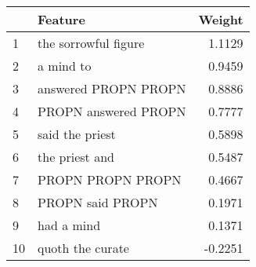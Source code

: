 \begin{tabular}{llr}
\toprule
{} &               Feature &  Weight \\
\midrule
1  &  the sorrowful figure &  1.1129 \\
2  &             a mind to &  0.9459 \\
3  &  answered PROPN PROPN &  0.8886 \\
4  &  PROPN answered PROPN &  0.7777 \\
5  &       said the priest &  0.5898 \\
6  &        the priest and &  0.5487 \\
7  &     PROPN PROPN PROPN &  0.4667 \\
8  &      PROPN said PROPN &  0.1971 \\
9  &            had a mind &  0.1371 \\
10 &      quoth the curate & -0.2251 \\
\bottomrule
\end{tabular}
